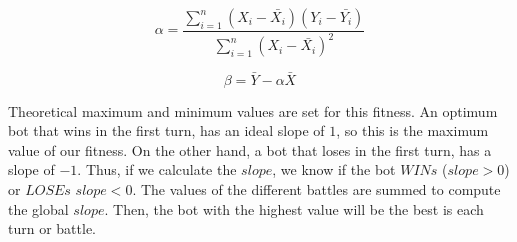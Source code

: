 \documentclass[preprint]{elsarticle}
\begin{document}

\begin{equation}
\label{eq:alpha}
        \alpha = \frac{\sum_{i=1}^{n}(X_{i} - \bar{X_{i}})(Y_{i} - \bar{Y_{i}})}{\sum_{i=1}^{n}(X_{i} - \bar{X_{i}})^{2}}
\end{equation}

\begin{equation}
\label{eq:beta}
        \beta = \bar{Y}-\alpha\bar{X}
\end{equation}





Theoretical maximum and minimum values are set for this fitness. An optimum bot that wins in the first turn, has an ideal slope of {$1$}, so this is the maximum value of our fitness. On the other hand, a bot that loses in the first turn,  has a slope of {$-1$}. Thus, if we calculate the $slope$, we know if the bot {$WINs$} ({$slope>0$}) or {$LOSEs$} {$slope<0$}. 
The values of the different battles are summed to compute the global $slope$. %
Then, the bot with the highest value will be the best is each turn or battle. 
\end{document}
